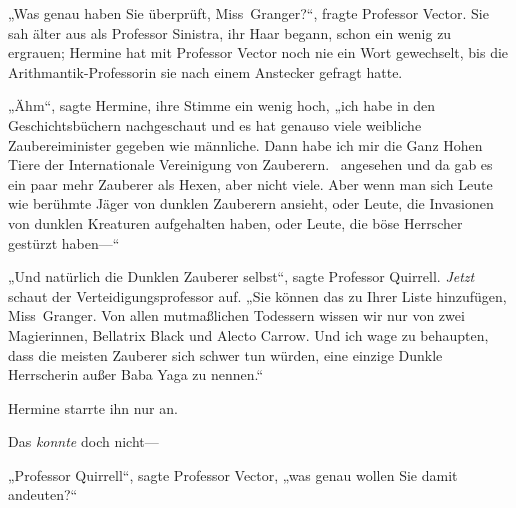 „Was genau haben Sie überprüft, Miss~Granger?“, fragte Professor Vector. Sie sah älter aus als Professor Sinistra, ihr Haar begann, schon ein wenig zu ergrauen; Hermine hat mit Professor Vector noch nie ein Wort gewechselt, bis die Arithmantik-Professorin sie nach einem Anstecker gefragt hatte.

„Ähm“, sagte Hermine, ihre Stimme ein wenig hoch, „ich habe in den Geschichtsbüchern nachgeschaut und es hat genauso viele weibliche Zaubereiminister gegeben wie männliche. Dann habe ich mir die Ganz Hohen Tiere der Internationale Vereinigung von Zauberern. ~angesehen und da gab es ein paar mehr Zauberer als Hexen, aber nicht viele. Aber wenn man sich Leute wie berühmte Jäger von dunklen Zauberern ansieht, oder Leute, die Invasionen von dunklen Kreaturen aufgehalten haben, oder Leute, die böse Herrscher gestürzt haben—“

„Und natürlich die Dunklen Zauberer selbst“, sagte Professor Quirrell. \emph{Jetzt} schaut der Verteidigungsprofessor auf. „Sie können das zu Ihrer Liste hinzufügen, Miss~Granger. Von allen mutmaßlichen Todessern wissen wir nur von zwei Magierinnen, Bellatrix Black und Alecto Carrow. Und ich wage zu behaupten, dass die meisten Zauberer sich schwer tun würden, eine einzige Dunkle Herrscherin außer Baba Yaga zu nennen.“

Hermine starrte ihn nur an.

Das \emph{konnte} doch nicht—

„Professor Quirrell“, sagte Professor Vector, „was genau wollen Sie damit andeuten?“

